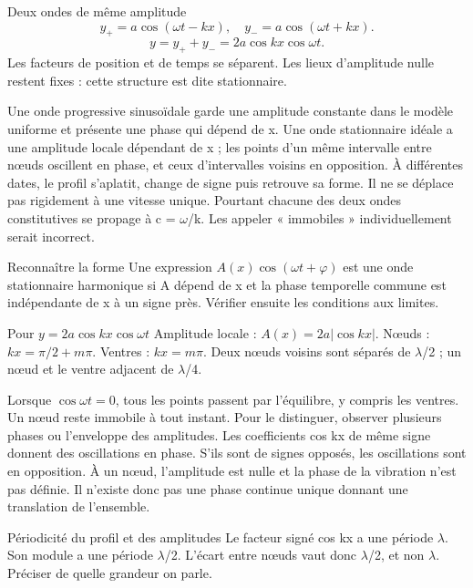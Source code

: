 \begin{loi}{Deux ondes de même amplitude}
\[y_+=a\cos(\omega t-kx),\quad y_-=a\cos(\omega t+kx).\]\[y=y_++y_-=2a\cos kx\cos\omega t.\]Les facteurs de position et de temps se séparent. Les lieux d’amplitude nulle restent fixes : cette structure est dite stationnaire.
\end{loi}
Une onde progressive sinusoïdale garde une amplitude constante dans le modèle uniforme et présente une phase qui dépend de x. Une onde stationnaire idéale a une amplitude locale dépendant de x ; les points d’un même intervalle entre nœuds oscillent en phase, et ceux d’intervalles voisins en opposition.
À différentes dates, le profil s’aplatit, change de signe puis retrouve sa forme. Il ne se déplace pas rigidement à une vitesse unique. Pourtant chacune des deux ondes constitutives se propage à c = \ensuremath{\omega}/k. Les appeler « immobiles » individuellement serait incorrect.
\begin{methode}{Reconnaître la forme}
Une expression $A(x)\cos(\omega t+\varphi)$ est une onde stationnaire harmonique si A dépend de x et la phase temporelle commune est indépendante de x à un signe près. Vérifier ensuite les conditions aux limites.
\end{methode}


\begin{loi}{Pour $y=2a\cos kx\cos\omega t$}
Amplitude locale : $A(x)=2a|\cos kx|$. Nœuds : $kx=\pi/2+m\pi$. Ventres : $kx=m\pi$. Deux nœuds voisins sont séparés de \ensuremath{\lambda}/2 ; un nœud et le ventre adjacent de \ensuremath{\lambda}/4.
\end{loi}
Lorsque $\cos\omega t=0$, tous les points passent par l’équilibre, y compris les ventres. Un nœud reste immobile à tout instant. Pour le distinguer, observer plusieurs phases ou l’enveloppe des amplitudes.
Les coefficients cos kx de même signe donnent des oscillations en phase. S’ils sont de signes opposés, les oscillations sont en opposition. À un nœud, l’amplitude est nulle et la phase de la vibration n’est pas définie. Il n’existe donc pas une phase continue unique donnant une translation de l’ensemble.
\begin{piege}{Périodicité du profil et des amplitudes}
Le facteur signé cos kx a une période \ensuremath{\lambda}. Son module a une période \ensuremath{\lambda}/2. L’écart entre nœuds vaut donc \ensuremath{\lambda}/2, et non \ensuremath{\lambda}. Préciser de quelle grandeur on parle.
\end{piege}


